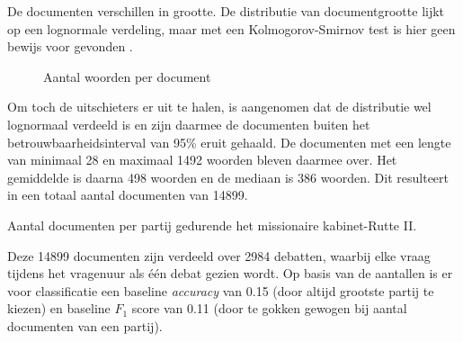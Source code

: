 De documenten verschillen in grootte. De distributie van documentgrootte lijkt op een lognormale verdeling, maar met een Kolmogorov-Smirnov test is hier geen bewijs voor gevonden \cite{Scipy}.

\begin{figure}[H]
    \centering
    \hspace*{-1in}
    \caption{Aantal woorden per document}%
    \label{fig:example}%
\end{figure}
Om toch de uitschieters er uit te halen, is aangenomen dat de distributie wel lognormaal verdeeld is en zijn daarmee de documenten buiten het betrouwbaarheidsinterval van 95\% eruit gehaald. De documenten met een lengte van minimaal 28 en maximaal 1492 woorden bleven daarmee over. Het gemiddelde is daarna 498 woorden en de mediaan is 386 woorden. Dit resulteert in een totaal aantal documenten van 14899.\par

\begin{table}[H]
\label{aantallen}
\caption{Aantal documenten per partij gedurende het missionaire kabinet-Rutte II.}
\centering

\end{table}
Deze 14899 documenten zijn verdeeld over 2984 debatten, waarbij elke vraag tijdens het vragenuur als één debat gezien wordt. Op basis van de aantallen is er voor classificatie een baseline \textit{accuracy} van 0.15 (door altijd grootste partij te kiezen) en baseline $F_1$ score van 0.11 (door te gokken gewogen bij aantal documenten van een partij).\par


